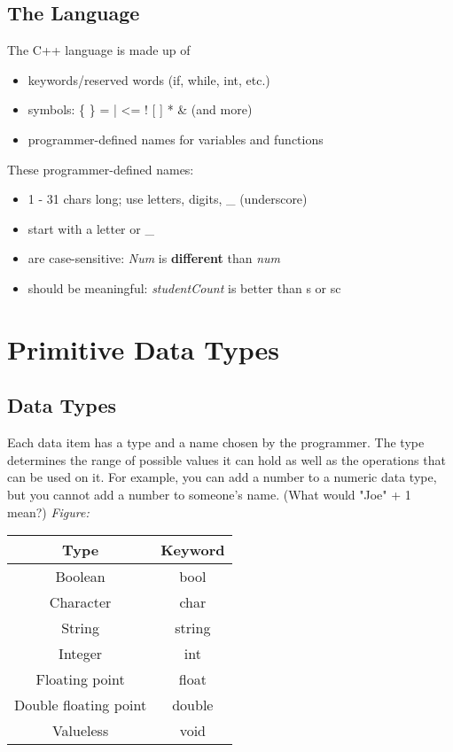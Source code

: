 \documentclass{report}
\begin{document}
    \subsection{The Language}
    \bigbreak \noindent 
    The C++ language is made up of 
    \begin{itemize}
        \item keywords/reserved words (if, while, int, etc.)
        \item symbols: \{ \} =  |  <=  ! [ ]  *  \&  (and more)
        \item programmer-defined names for variables and functions
    \end{itemize}
    \bigbreak \noindent 
    These programmer-defined names:
    \begin{itemize}
        \item  1 - 31 chars long; use letters, digits, \_ (underscore)
        \item start with a letter or \_
        \item are case-sensitive: \textit{Num} is \textbf{different} than \textit{num}
        \item should be meaningful: \textit{studentCount} is better than s or sc
    \end{itemize}

    \pagebreak \bigbreak \noindent 
    \section{\LARGE Primitive Data Types}
    \bigbreak \noindent 

    \subsection{Data Types}
    \bigbreak \noindent 
    Each data item has a type and a name chosen by the programmer. The type determines the range of possible values it can hold as well as the operations that can be used on it. For example, you can add a number to a numeric data type, but you cannot add a number to someone's name. (What would "Joe" + 1 mean?)
    \bigbreak \noindent 
    \textit{Figure:}
    \begin{center}
    \begin{tabular}{|c|c|}
        \hline
        Type & Keyword \\
        \hline
        Boolean & bool \\
        Character & char \\
        String & string \\
        Integer & int \\
        Floating point & float \\
        Double floating point & double \\
        Valueless & void \\
        \hline
    \end{tabular}
        \end{center}
        \bigbreak \noindent 
        \bigbreak \noindent 
\end{document}
